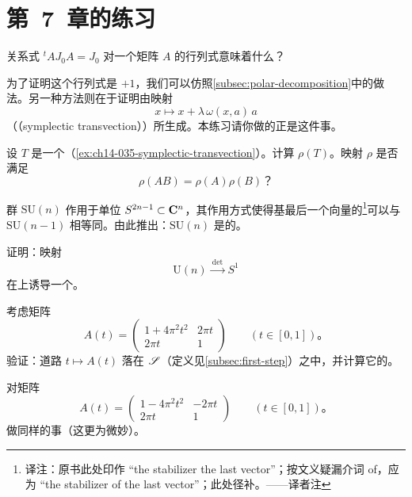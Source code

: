 
\section{第~7~章的练习}
\label{sec:ch14-exercises-ch7}

%

\begin{exercise}\label{ex:ch14-035-symplectic-transvection}
关系式 ${}^tAJ_0A=J_0$ 对一个\trSymplectic{}矩阵 $A$ 的行列式意味着什么？

为了证明这个行列式是 $+1$，我们可以仿照\cref{subsec:polar-decomposition}中的做法。另一种方法则在于证明\trSymplecticGroup{}由映射
\[
x\longmapsto x+\lambda\,\omega(x,a)\,a
\]
（\textbf{\trSymplecticTransvection}（symplectic transvection））所生成。本练习请你做的正是这件事。
\end{exercise}

\begin{exercise}\label{ex:ch14-036-rho-transvection}
设 $T$ 是一个\trSymplecticTransvection（\cref{ex:ch14-035-symplectic-transvection}）。计算 $\rho(T)$。映射 $\rho$ 是否满足
\[
\rho(AB)=\rho(A)\rho(B)\text{？}
\]
\end{exercise}

\begin{exercise}\label{ex:ch14-037-fundamental-group-un}
群 $\mathrm{SU}(n)$ 作用于单位\trSphere{} $S^{2n-1}\subset\mathbf{C}^{n}$，其作用方式使得\trCanonical{}基最后一个向量的\trStabilizer{}\footnote{译注：原书此处印作 “the stabilizer the last vector”；按文义疑漏介词 of，应为 “the stabilizer of the last vector”；此处径补。——译者注}可以与 $\mathrm{SU}(n-1)$ 相等同。由此推出：$\mathrm{SU}(n)$ 是\trSimplyConnected{}的。

证明：映射
\[
\mathrm{U}(n)\xrightarrow{\ \det\ }S^{1}
\]
在\trFundamentalGroup{}上诱导一个\trIsomorphism。
\end{exercise}

\begin{exercise}\label{ex:ch14-038-maslov-path-examples}
考虑矩阵
\[
A(t)=\begin{pmatrix}1+4\pi^{2}t^{2} & 2\pi t\\[2pt] 2\pi t & 1\end{pmatrix}
\qquad(t\in[0,1])\text{。}
\]
验证：道路 $t\mapsto A(t)$ 落在 $\mathscr{S}$（定义见\cref{subsec:first-step}）之中，并计算它的\trMaslovIndex。

对矩阵
\[
A(t)=\begin{pmatrix}1-4\pi^{2}t^{2} & -2\pi t\\[2pt] 2\pi t & 1\end{pmatrix}
\qquad(t\in[0,1])\text{。}
\]
做同样的事（这更为微妙）。
\end{exercise}


